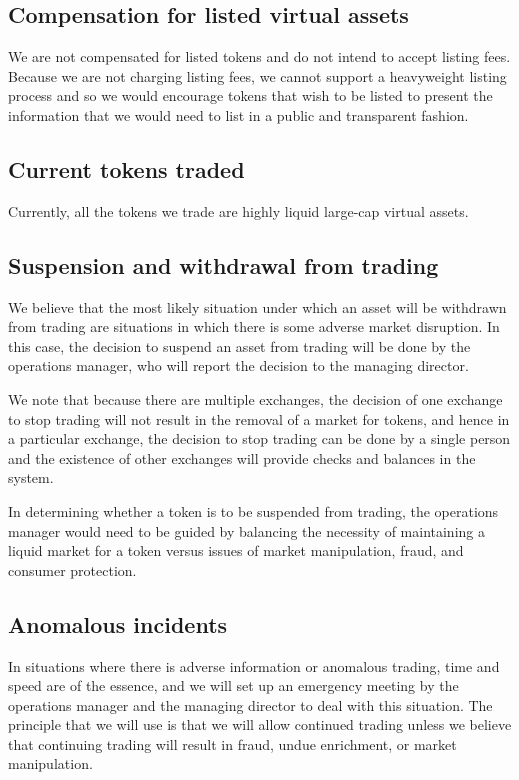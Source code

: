\subsection{Compensation for listed virtual assets}

We are not compensated for listed tokens and do not intend to accept
listing fees.  Because we are not charging listing fees, we cannot
support a heavyweight listing process and so we would encourage
tokens that wish to be listed to present the information that we would
need to list in a public and transparent fashion.

\subsection{Current tokens traded}
Currently, all the tokens we trade are highly liquid large-cap
virtual assets.


\subsection{Suspension and withdrawal from trading}
We believe that the most likely situation under which an asset will be
withdrawn from trading are situations in which there is some adverse
market disruption.  In this case, the decision to suspend an asset from
trading will be done by the operations manager, who will report the
decision to the managing director.

We note that because there are multiple exchanges, the decision of one
exchange to stop trading will not result in the removal of a market
for tokens, and hence in a particular exchange, the decision to stop
trading can be done by a single person and the existence of other
exchanges will provide checks and balances in the system.

In determining whether a token is to be suspended from trading, the
operations manager would need to be guided by balancing the necessity
of maintaining a liquid market for a token versus issues of market
manipulation, fraud, and consumer protection.


\subsection{Anomalous incidents}
In situations where there is adverse information or anomalous trading,
time and speed are of the essence, and we will set up an emergency
meeting by the operations manager and the managing director to deal
with this situation.  The principle that we will use is that we will
allow continued trading unless we believe that continuing trading will
result in fraud, undue enrichment, or market manipulation.

